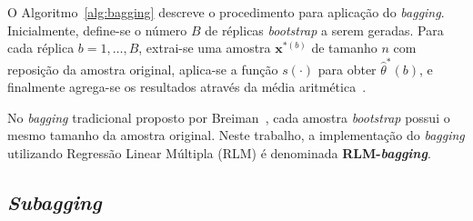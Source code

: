 \begin{center}
\begin{minipage}{0.95\textwidth}
\centering %
\end{minipage}
\end{center}


O Algoritmo~\ref{alg:bagging} descreve o procedimento para aplicação do \textit{bagging}. Inicialmente, define-se o número $B$ de réplicas \textit{bootstrap} a serem geradas. Para cada réplica $b = 1, \ldots, B$, extrai-se uma amostra $\mathbf{x}^{*(b)}$ de tamanho $n$ com reposição da amostra original, aplica-se a função $s(\cdot)$ para obter $\hat{\theta}^{*}(b)$, e finalmente agrega-se os resultados através da média aritmética~\cite{BAUER:1999}. 

No \textit{bagging} tradicional proposto por Breiman~\cite{BREIMAN:2001}, cada amostra \textit{bootstrap} possui o mesmo tamanho da amostra original. Neste trabalho, a implementação do \textit{bagging} utilizando Regressão Linear Múltipla (RLM) é denominada \textbf{RLM-\textit{bagging}}.

\subsection{\textit{Subagging}}
\label{sec:subagging}

